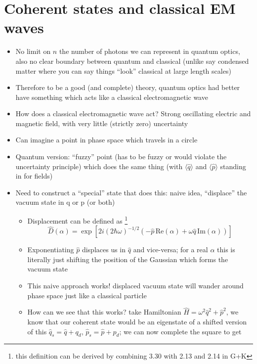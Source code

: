 \documentclass[english]{article}
\newcommand{\average}[1]{\langle #1 \rangle}
\begin{document}
\section{Coherent states and classical EM waves}

\begin{itemize}
\item No limit on $n$ the number of photons we can represent in quantum optics, also no clear boundary between quantum and classical (unlike say condensed matter where you can say things ``look'' classical at large length scales)
\item Therefore to be a good (and complete) theory, quantum optics had better have something which acts like a classical electromagnetic wave
\item How does a classical electromagnetic wave act? Strong oscillating electric and magnetic field, with very little (strictly zero) uncertainty
\item Can imagine a point in phase space which travels in a circle
\item Quantum version: ``fuzzy'' point (has to be fuzzy or would violate the uncertainty principle) which does the same thing (with $\average{\hat{q}}$ and $\average{\hat{p}}$ standing in for fields)
\item Need to construct a ``special'' state that does this: naive idea, ``displace'' the vacuum state in q or p (or both)
\begin{itemize}
\item Displacement can be defined as \footnote{this definition can be derived by combining 3.30 with 2.13 and 2.14 in G+K} 
\begin{equation}
\hat{D}(\alpha)=\exp\left[2i(2 \hbar \omega)^{-1/2}\left(-\hat{p}\,\mathrm{Re}(\alpha)+\omega \hat{q}\,\mathrm{Im}(\alpha)\right) \right]
\end{equation}
\item Exponentiating $\hat{p}$ displaces us in $\hat{q}$ and vice-versa; for a real $\alpha$ this is literally just shifting the position of the Gaussian which forms the vacuum state
\item This naive approach works! displaced vacuum state will wander around phase space just like a classical particle
\item How can we see that this works? take Hamiltonian $\hat{H}=\omega^2\hat{q}^2+\hat{p}^2$, we know that our coherent state would be an eigenstate of a shifted version of this $\hat{q}_s=\hat{q}+q_d$, $\hat{p}_s=\hat{p}+p_d$; we can now complete the square to get 

\end{itemize}
\end{itemize}
\end{document}
